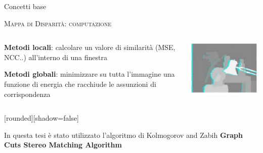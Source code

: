 \documentclass{beamer}
\begin{document}
\begin{section}{Concetti base}


\begin{frame}[t]{\textsc{Mappa di Disparit\`{a}: computazione}}
\begin{columns}
\begin{column}{5cm}
\vspace{1em}
\begin{itemize}
\item \small{\textbf{Metodi locali}: calcolare un valore di similarit\`{a} (MSE, NCC..) all'interno di una finestra  
\item \textbf{Metodi globali}: minimizzare su tutta l'immagine una funzione di energia che racchiude le assunzioni di corrispondenza
}
\end{itemize}
\end{column}
\begin{column}{5.5cm}
\vspace{1.5em}
\centering
\includegraphics[width=1\linewidth]{./img/graph.png}
\end{column}
\end{columns}
\vspace{-1em}
\begin{center}
	[rounded][shadow=false]
\begin{block}{}
\center \small{In questa tesi \`{e} stato utilizzato l'algoritmo di Kolmogorov and Zabih \textbf{Graph Cuts Stereo Matching Algorithm}}
\end{block}
\end{center}
\end{frame}



\end{section}
\end{document}
